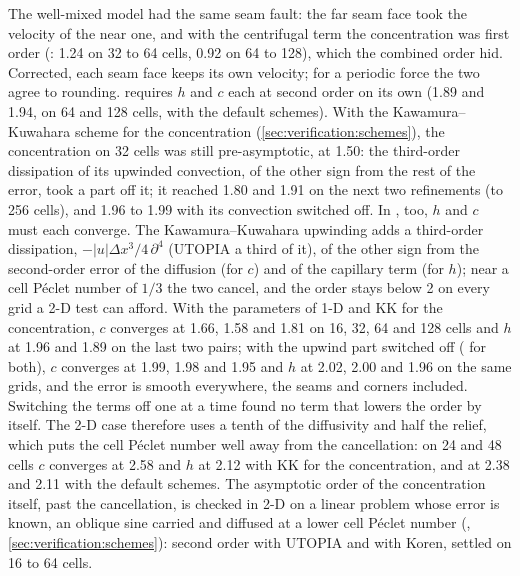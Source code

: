 The well-mixed model had the same seam fault: the far seam face took the
velocity of the near one, and with the centrifugal term the concentration
was first order (: 1.24 on 32 to 64 cells, 0.92 on 64 to
128), which the combined order hid. Corrected, each seam face keeps its own
velocity; for a periodic force the two agree to rounding. 
requires $h$ and $c$ each at second order on its own (1.89 and 1.94, on
64 and 128 cells, with the default schemes). With the Kawamura--Kuwahara
scheme for the concentration (\cref{sec:verification:schemes}), the
concentration on 32 cells was still
pre-asymptotic, at 1.50: the third-order dissipation of its upwinded
convection, of the other sign from the rest of the error, took a part off
it; it reached 1.80 and 1.91 on the next two refinements (to 256 cells), and
1.96 to 1.99 with its convection switched off. In , too, $h$ and $c$ must each
converge. The Kawamura--Kuwahara upwinding adds a third-order dissipation,
$-|u|\Delta x^3/4\,\partial^4$ (UTOPIA a third of it), of
the other sign from the second-order error of the diffusion (for $c$) and of
the capillary term (for $h$); near a cell Péclet number of $1/3$ the two
cancel, and the order stays below 2 on every grid a 2-D test can afford. With
the parameters of 1-D and KK for the concentration, $c$ converges at 1.66, 1.58 and 1.81 on 16, 32, 64 and
128 cells and $h$ at 1.96 and 1.89 on the last two pairs; with the upwind part
switched off ( for both), $c$ converges at 1.99, 1.98 and
1.95 and $h$ at 2.02, 2.00 and 1.96 on the same grids, and the error is smooth
everywhere, the seams and corners included. Switching the terms off one at a
time found no term that lowers the order by itself. The 2-D case therefore
uses a tenth of the diffusivity and half the relief, which puts the cell
Péclet number well away from the cancellation: on 24 and 48 cells $c$
converges at 2.58 and $h$ at 2.12 with KK for the concentration, and at
2.38 and 2.11 with the default schemes. The asymptotic order of the concentration itself,
past the cancellation, is checked in 2-D on a linear problem whose error is
known, an oblique sine carried and diffused at a lower cell Péclet number
(, \cref{sec:verification:schemes}): second order with
UTOPIA and with Koren, settled on 16 to 64 cells.

